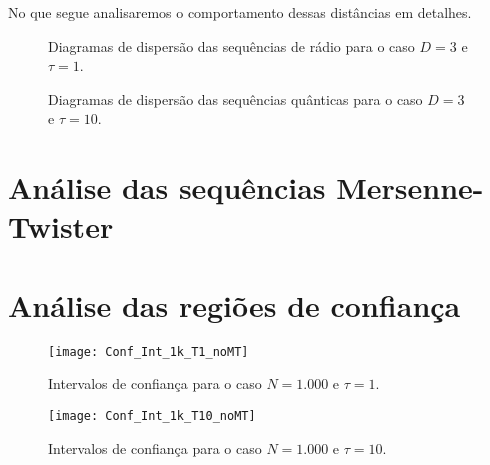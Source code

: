 No que segue analisaremos o comportamento dessas distâncias em detalhes.


\begin{figure}
	\centering
	\caption{Diagramas de dispersão das sequências de rádio para o caso $D=3$ e $\tau=1$.}\label{Fig:RadioD3tau1}
\end{figure}

\begin{figure}
	\centering
	\caption{Diagramas de dispersão das sequências quânticas para o caso $D=3$ e $\tau=10$.}\label{Fig:QuantD3tau10}
\end{figure}


\section{Análise das sequências Mersenne-Twister}


\section{Análise das regiões de confiança}

\begin{figure}
	\centering
	\texttt{[image: Conf\_Int\_1k\_T1\_noMT]}
	\caption{Intervalos de confiança para o caso $N=1.000$ e $\tau=1$.}\label{Fig:Conf_Int_1k_T1}
\end{figure}

\begin{figure}
	\centering
	\texttt{[image: Conf\_Int\_1k\_T10\_noMT]}
	\caption{Intervalos de confiança para o caso $N=1.000$ e $\tau=10$.}\label{Fig:Conf_Int_1k_T10}
\end{figure}

